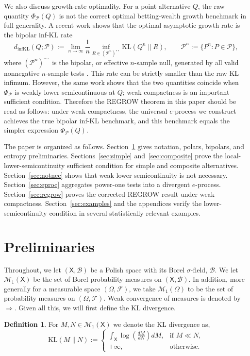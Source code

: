 \documentclass[11pt]{article}
\newcommand{\KL}{\mathrm{KL}}
\newcommand{\dinfKL}{d_{\mathrm{infKL}}}
\newcommand{\Pcal}{\mathcal{P}}
\newcommand{\X}{\mathsf{X}}
\newcommand{\B}{\mathcal{B}}
\theoremstyle{definition}
\newtheorem{definition}[theorem]{Definition}
\theoremstyle{definition}
\begin{document}
We also discuss growth-rate optimality.  For a point alternative $Q$, the raw quantity $\Phi_\Pcal(Q)$ is not the correct optimal betting-wealth growth benchmark in full generality.  A recent work \cite{ramramdas2026optimalbettingwealth} shows that the optimal asymptotic growth rate is the bipolar inf-KL rate
\[
  \dinfKL(Q;\Pcal)
  :=\lim_{n\to\infty}\frac1n
  \inf_{R\in(\Pcal^n)^{\circ\circ}}\KL(Q^n\|R),
  \qquad
  \Pcal^n:=\{P^n:P\in\Pcal\},
\]
where $(\Pcal^n)^{\circ\circ}$ is the bipolar, or effective $n$-sample null, generated by all valid nonnegative $n$-sample tests \parencite{ramramdas2026optimalbettingwealth}.  This rate can be strictly smaller than the raw KL infimum.  However, the same work shows that the two quantities coincide when $\Phi_\Pcal$ is weakly lower semicontinuous at $Q$; weak compactness is an important sufficient condition.  Therefore the REGROW theorem in this paper should be read as follows: under weak compactness, the universal $e$-process we construct achieves the true bipolar inf-KL benchmark, and this benchmark equals the simpler expression $\Phi_\Pcal(Q)$.

The paper is organized as follows.  Section~\ref{sec:warm} gives notation, polars, bipolars, and entropy preliminaries.  Sections~\ref{sec:simple} and~\ref{sec:composite} prove the local-lower-semicontinuity sufficient condition for simple and composite alternatives.  Section~\ref{sec:notnec} shows that weak lower semicontinuity is not necessary.  Section~\ref{sec:eproc} aggregates power-one tests into a divergent $e$-process.  Section~\ref{sec:regrow} proves the corrected REGROW result under weak compactness.  Section~\ref{sec:examples} and the appendices verify the lower-semicontinuity condition in several statistically relevant examples.
\section{Preliminaries}\label{sec:warm}
Throughout, we let $(\X, \B)$ be a Polish space with its Borel $\sigma$-field, $\B$. We let $\mathcal{M}_1(\X)$ be the set of Borel probability measures on $(\X,\B)$. In addition, more generally for a measurable space $(\Omega, \mathcal F)$, we take  $\mathcal{M}_1(\Omega)$ to be the set of probability measures on $(\Omega, \mathcal F)$. Weak convergence of measures is denoted by $\Rightarrow$. Given all this, we will first define the KL divergence.

\begin{definition}\label{def:kl}
For $M, N\in\mathcal{M}_1(\X)$ we denote the KL divergence as,
\[
\KL(M\|N):=
\begin{cases}
\displaystyle \int_\X \log\left(\frac{dM}{dN}\right)dM, &\text{if } M\ll N,\\[0.6em]
+\infty, &\text{otherwise.}   
\end{cases}
\]
\end{definition}
\end{document}
